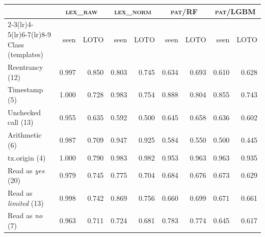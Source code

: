 \begin{tabular}{@{}lrrrrrrrr@{}}
\toprule
 & \multicolumn{2}{c}{\textsc{lex\_raw}} & \multicolumn{2}{c}{\textsc{lex\_norm}} & \multicolumn{2}{c}{\textsc{pat}/RF} & \multicolumn{2}{c}{\textsc{pat}/LGBM}\\
\cmidrule(lr){2-3}\cmidrule(lr){4-5}\cmidrule(lr){6-7}\cmidrule(lr){8-9}
Class (templates) & seen & LOTO & seen & LOTO & seen & LOTO & seen & LOTO\\
\midrule
Reentrancy (12) & 0.997 & 0.850 & 0.803 & 0.745 & 0.634 & 0.693 & 0.610 & 0.628\\
Timestamp (5) & 1.000 & 0.728 & 0.983 & 0.754 & 0.888 & 0.804 & 0.855 & 0.743\\
Unchecked call (13) & 0.955 & 0.635 & 0.592 & 0.500 & 0.645 & 0.658 & 0.636 & 0.602\\
Arithmetic (6) & 0.987 & 0.709 & 0.947 & 0.925 & 0.584 & 0.550 & 0.500 & 0.445\\
tx.origin (4) & 1.000 & 0.790 & 0.983 & 0.982 & 0.953 & 0.963 & 0.963 & 0.935\\
\midrule
Read as \emph{yes} (20) & 0.979 & 0.745 & 0.775 & 0.704 & 0.684 & 0.676 & 0.673 & 0.629\\
Read as \emph{limited} (13) & 0.998 & 0.742 & 0.869 & 0.756 & 0.660 & 0.699 & 0.671 & 0.661\\
Read as \emph{no} (7) & 0.963 & 0.711 & 0.724 & 0.681 & 0.783 & 0.774 & 0.645 & 0.617\\
\bottomrule
\end{tabular}
